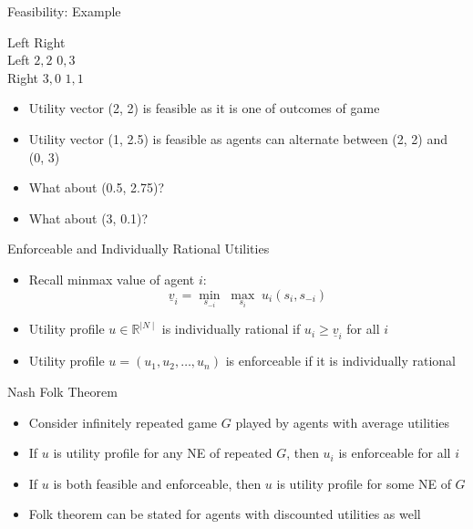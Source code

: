 \documentclass[11pt,aspectratio=169,handout]{beamer}
\begin{document}
  
  \begin{frame}{Feasibility: Example}
   \begin{center}
    \hspace{-2em}
    \begin{game}{2}{2}
     		\> Left		\> Right		\\
     Left	\> $2, 2$	\> $0, 3$	\\
     Right	\> $3, 0$	\> $1, 1$
    \end{game}
   \end{center}
   \vspace{1em}
   \begin{itemize}[<+->]
    \item Utility vector (2, 2) is feasible as it is one of outcomes of game
    \item Utility vector (1, 2.5) is feasible as agents can alternate between (2, 2) and (0, 3)
    \item What about (0.5, 2.75)?
    \item What about (3, 0.1)?
   \end{itemize}
  \end{frame}


  \begin{frame}{Enforceable and Individually Rational Utilities}
   \begin{itemize}[<+->]
   \setlength{\itemsep}{1.2em}
    \item Recall \alert{minmax value} of agent $i$: 
    $$\underline{v}_i = \underset{s_{-i}}{\min} \; \underset{s_{i}}{\max} \; u_{i}(s_i,s_{-i})$$
    \item Utility profile $u \in  \mathbb{R} ^{\mid N \mid}$  is \alert{individually rational} if $u_{i}  \ge \underline{v}_i$ for all $i$
    \item Utility profile $u = (u_1,u_2,\dots,u_n)$ is \alert{enforceable} if it is individually rational
   \end{itemize}
  \end{frame}
  
  
  \begin{frame}{Nash Folk Theorem}
   \begin{itemize}[<+->]
   \setlength{\itemsep}{1.2em}
    \item Consider infinitely repeated game $G$ played by agents with \alert{average utilities}
    \item If $u$ is utility profile for any NE of repeated $G$, then $u_i$ is enforceable for all $i$
    \item If $u$ is both feasible and enforceable, then $u$ is utility profile for some NE of $G$
    \item Folk theorem can be stated for agents with discounted utilities as well
   \end{itemize}
  \end{frame}
  
\end{document}
